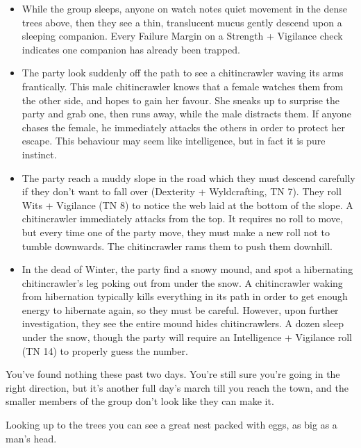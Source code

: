 \begin{multicols}{2}
\begin{itemize}
  \item
  While the group sleeps, anyone on watch notes quiet movement in the dense trees above, then they see a thin, translucent mucus gently descend upon a sleeping companion.
  Every Failure Margin on a Strength + Vigilance check indicates one companion has already been trapped.
  \item
  The party look suddenly off the path to see a chitincrawler waving its arms frantically.
  This male chitincrawler knows that a female watches them from the other side, and hopes to gain her favour.
  She sneaks up to surprise the party and grab one, then runs away, while the male distracts them.
  If anyone chases the female, he immediately attacks the others in order to protect her escape.
  This behaviour may seem like intelligence, but in fact it is pure instinct.
  \item
  The party reach a muddy slope in the road which they must descend carefully if they don't want to fall over (Dexterity + Wyldcrafting, TN 7).
  They roll Wits + Vigilance (TN 8) to notice the web laid at the bottom of the slope.
  A chitincrawler immediately attacks from the top.
  It requires no roll to move, but every time one of the party move, they must make a new roll not to tumble downwards.
  The chitincrawler rams them to push them downhill.
  \item
  In the dead of Winter, the party find a snowy mound, and spot a hibernating chitincrawler's leg poking out from under the snow.
  A chitincrawler waking from hibernation typically kills everything in its path in order to get enough energy to hibernate again, so they must be careful.
  However, upon further investigation, they see the entire mound hides chitincrawlers.
  A dozen sleep under the snow, though the party will require an Intelligence + Vigilance roll (TN 14) to properly guess the number.
\end{itemize}


\label{griffin}

\begin{boxtext}

  You've found nothing these past two days.  You're still sure you're going in the right direction, but it's another full day's march till you reach the town, and the smaller members of the group don't look like they can make it.

  Looking up to the trees you can see a great nest packed with eggs, as big as a man's head.


\end{boxtext}
\end{multicols}
